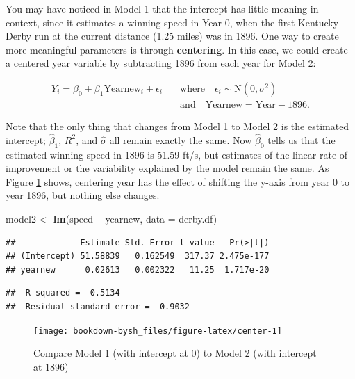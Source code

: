 \documentclass[
]{krantz}
\newenvironment{Shaded}{\begin{snugshade}}{\end{snugshade}}
\newcommand{\DataTypeTok}[1]{\textcolor[rgb]{0.27,0.27,0.27}{#1}}
\newcommand{\KeywordTok}[1]{\textcolor[rgb]{0.27,0.27,0.27}{\textbf{#1}}}
\newcommand{\NormalTok}[1]{#1}
\newcommand{\OperatorTok}[1]{\textcolor[rgb]{0.43,0.43,0.43}{\textbf{#1}}}
\newcommand{\StringTok}[1]{\textcolor[rgb]{0.5,0.5,0.5}{#1}}
\begin{document}
You may have noticed in Model 1 that the intercept has little meaning in context, since it estimates a winning speed in Year 0, when the first Kentucky Derby run at the current distance (1.25 miles) was in 1896. One way to create more meaningful parameters is through \textbf{centering}.  In this case, we could create a centered year variable by subtracting 1896 from each year for Model 2:

\begin{equation*}
\begin{split}
Y_{i}=\beta_{0}+\beta_{1}\textrm{Yearnew}_{i}+\epsilon_{i}\quad &\textrm{where} \quad \epsilon_{i}\sim \textrm{N}(0,\sigma^2) \\
    &\textrm{and} \quad \textrm{Yearnew}=\textrm{Year}-1896.
\end{split}
\end{equation*}

Note that the only thing that changes from Model 1 to Model 2 is the estimated intercept; \(\hat{\beta}_{1}\), \(R^2\), and \(\hat{\sigma}\) all remain exactly the same. Now \(\hat{\beta}_{0}\) tells us that the estimated winning speed in 1896 is 51.59 ft/s, but estimates of the linear rate of improvement or the variability explained by the model remain the same. As Figure \ref{fig:center} shows, centering year has the effect of shifting the y-axis from year 0 to year 1896, but nothing else changes.

\begin{Shaded}
\begin{Highlighting}[]
\NormalTok{model2 <-}\StringTok{ }\KeywordTok{lm}\NormalTok{(speed }\OperatorTok{~}\StringTok{ }\NormalTok{yearnew, }\DataTypeTok{data =}\NormalTok{ derby.df)}
\end{Highlighting}
\end{Shaded}

\begin{verbatim}
##             Estimate Std. Error t value   Pr(>|t|)
## (Intercept) 51.58839   0.162549  317.37 2.475e-177
## yearnew      0.02613   0.002322   11.25  1.717e-20
\end{verbatim}

\begin{verbatim}
##  R squared =  0.5134 
##  Residual standard error =  0.9032
\end{verbatim}

\begin{figure}

{\centering \texttt{[image: bookdown-bysh\_files/figure-latex/center-1]} 

}

\caption{Compare Model 1 (with intercept at 0) to Model 2 (with intercept at 1896)}\label{fig:center}
\end{figure}
\end{document}
